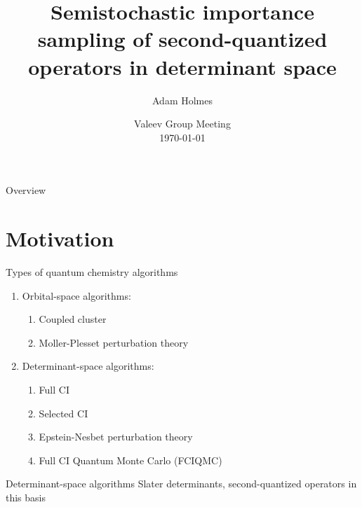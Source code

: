 \documentclass[amsmath]{beamer}
\begin{document}
	\title[Semistochastic importance sampling]{Semistochastic importance sampling of second-quantized operators in determinant space}
	\author[A. Holmes]{Adam Holmes}
	\date{Valeev Group Meeting\\\today} 
	
	\frame{\titlepage} 
	
	\begin{frame}{Overview}
		\tableofcontents[hideallsubsections]
	\end{frame}

\section{Motivation}
\begin{frame}{Types of quantum chemistry algorithms}
	\begin{enumerate}
		\item Orbital-space algorithms:
		\begin{enumerate}
			\item Coupled cluster
			\item Moller-Plesset perturbation theory
			\linebreak
		\end{enumerate}
		\item Determinant-space algorithms:
		\begin{enumerate}
			\item Full CI
			\item Selected CI
			\item Epstein-Nesbet perturbation theory
			\item Full CI Quantum Monte Carlo (FCIQMC)
		\end{enumerate}
	\end{enumerate}
\end{frame}

\begin{frame}{Determinant-space algorithms}
	Slater determinants, second-quantized operators in this basis
\end{frame}
\end{document}
